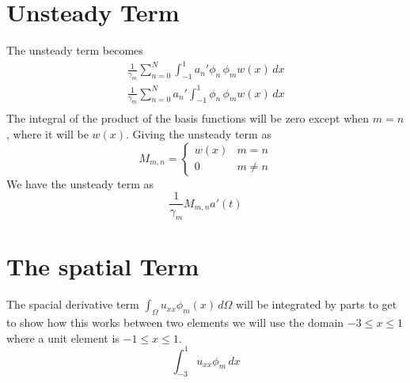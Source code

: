 \documentclass[12pt]{article}%
\begin{document}
\section{Unsteady Term}
The unsteady term becomes 
\begin{eqnarray}
\frac{1}{\gamma_m}\sum_{n=0}^N \int_{-1}^{1} a_n'\phi_n\,\phi_m w(x)\,dx \\
\frac{1}{\gamma_m}\sum_{n=0}^N a_n'\int_{-1}^{1}\phi_n\,\phi_m w(x)\,dx\\
\end{eqnarray}
The integral of the product of the basis functions will be zero except when $m=n$, where it will be $w(x)$. Giving the unsteady term as 
\begin{equation}M_{m,n}=\begin{cases} w(x)& m=n \\ 0 & m\neq n\end{cases}
\end{equation}
We have the unsteady term as
\begin{equation}
\frac{1}{\gamma_m}M_{m,n}a'(t)
\end{equation}

\section{The spatial Term}
The spacial derivative term $\int_\Omega u_{xx} \phi_m(x)\,d\Omega$ will be integrated by parts to get to show how this works between two elements we will use the domain $-3\leq x \leq 1$ where a unit element is $-1\leq x \leq 1$.
\begin{equation}
\int_{-3}^1 u_{xx} \phi_m\,dx
\end{equation}
\end{document}
